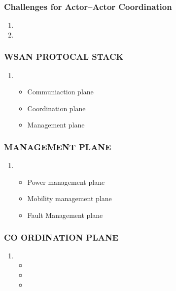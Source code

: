 \documentclass[11pt]{class}
\begin{document}
										\begin{frame}
											\frametitle{Challenges for Actor–Actor Coordination}
											\begin{enumerate}
												\item 
												\item 
											\end{enumerate}
										\end{frame}
										
										\begin{frame}
											\frametitle{WSAN PROTOCAL STACK}
											\begin{enumerate}
												\item 
												\begin{itemize}
													\item Communiaction plane 
													\item Coordination plane
													\item Management plane
												\end{itemize}
												 
											\end{enumerate}
										\end{frame}
											\begin{frame}
												\frametitle{MANAGEMENT PLANE}
												\begin{enumerate}
													\item 
													\begin{itemize}
														\item Power management plane 
														\item Mobility management plane
														\item Fault Management plane
													\end{itemize}
													
												\end{enumerate}
											\end{frame}
											\begin{frame}
												\frametitle{CO ORDINATION PLANE}
												\begin{enumerate}
													\item 
													\begin{itemize}
														\item  
														\item 
														\item 
													\end{itemize}
													
												\end{enumerate}
											\end{frame}
\end{document}
